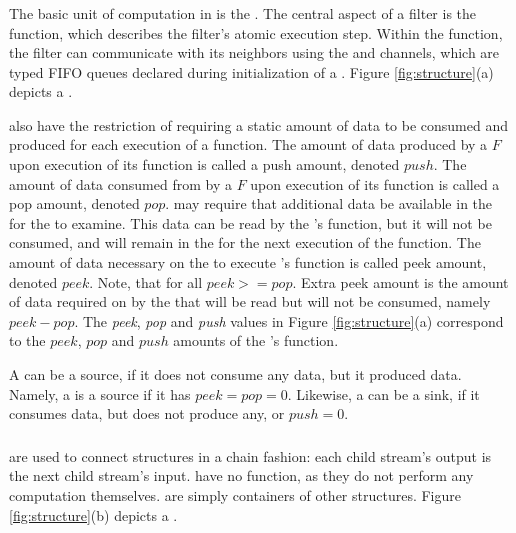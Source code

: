 \subsubsection{\filters}

The basic unit of computation in {\StreamIt} is the {\filter}. The
central aspect of a filter is the {\work} function, which
describes the filter's atomic execution step. Within the {\work}
function, the filter can communicate with its neighbors using the
{\Input} and {\Output} channels, which are typed FIFO queues
declared during initialization of a {\filter}.  Figure
\ref{fig:structure}(a) depicts a {\filter}.

{\filters} also have the restriction of requiring a static amount
of data to be consumed and produced for each execution of a
{\work} function.  The amount of data produced by a {\filter} $F$
upon execution of its {\work} function is called a push amount,
denoted $push$. The amount of data consumed from {\Input}
{\Channel} by a {\filter} $F$ upon execution of its {\work}
function is called a pop amount, denoted $pop$.  {\filters} may
require that additional data be available in the {\Input}
{\Channel} for the {\filter} to examine.  This data can be read by
the {\filter}'s {\work} function, but it will not be consumed, and
will remain in the {\Channel} for the next execution of the
{\work} function.  The amount of data necessary on the {\Input}
{\Channel} to execute {\filter}'s {\work} function is called peek
amount, denoted $peek$.  Note, that for all {\filters} $peek
>= pop$.  Extra peek amount is the amount of data required on by
the {\filter} that will be read but will not be consumed, namely
$peek - pop$.  The \emph{peek}, \emph{pop} and \emph{push} values
in Figure \ref{fig:structure}(a) correspond to the $peek$, $pop$
and $push$ amounts of the {\filter}'s {\work} function.

A {\filter} can be a source, if it does not consume any data, but
it produced data.  Namely, a {\filter} is a source if it has $peek
= pop = 0$. Likewise, a {\filter} can be a sink, if it consumes
data, but does not produce any, or $push = 0$.

\subsubsection{\pipelines}

{\pipelines} are used to connect {\StreamIt} structures in a chain
fashion: each child stream's output is the next child stream's
input. {\pipelines} have no {\work} function, as they do not perform
any computation themselves. {\pipelines} are simply containers of
other {\StreamIt} structures.  Figure \ref{fig:structure}(b) depicts
a {\pipeline}.

